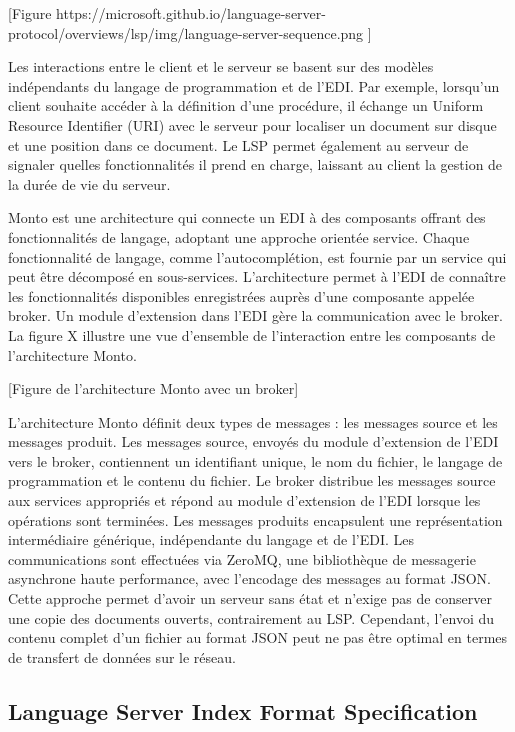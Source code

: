     [Figure https://microsoft.github.io/language-server-protocol/overviews/lsp/img/language-server-sequence.png ]

Les interactions entre le client et le serveur se basent sur des modèles indépendants du langage de programmation et de l'EDI. Par exemple, lorsqu'un client souhaite accéder à la définition d'une procédure, il échange un Uniform Resource Identifier (URI) avec le serveur pour localiser un document sur disque et une position dans ce document. Le LSP permet également au serveur de signaler quelles fonctionnalités il prend en charge, laissant au client la gestion de la durée de vie du serveur.

Monto est une architecture qui connecte un EDI à des composants offrant des fonctionnalités de langage, adoptant une approche orientée service. Chaque fonctionnalité de langage, comme l'autocomplétion, est fournie par un service qui peut être décomposé en sous-services. L'architecture permet à l'EDI de connaître les fonctionnalités disponibles enregistrées auprès d'une composante appelée broker. Un module d'extension dans l'EDI gère la communication avec le broker. La figure X illustre une vue d'ensemble de l'interaction entre les composants de l'architecture Monto.

    [Figure de l'architecture Monto avec un broker]


L'architecture Monto définit deux types de messages : les messages source et les messages produit. Les messages source, envoyés du module d'extension de l'EDI vers le broker, contiennent un identifiant unique, le nom du fichier, le langage de programmation et le contenu du fichier. Le broker distribue les messages source aux services appropriés et répond au module d'extension de l'EDI lorsque les opérations sont terminées. Les messages produits encapsulent une représentation intermédiaire générique, indépendante du langage et de l'EDI. Les communications sont effectuées via ZeroMQ, une bibliothèque de messagerie asynchrone haute performance, avec l'encodage des messages au format JSON. Cette approche permet d'avoir un serveur sans état et n'exige pas de conserver une copie des documents ouverts, contrairement au LSP. Cependant, l'envoi du contenu complet d'un fichier au format JSON peut ne pas être optimal en termes de transfert de données sur le réseau.


\subsection{Language Server Index Format Specification}

